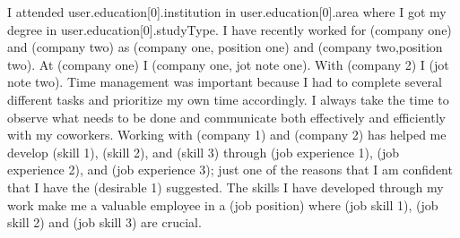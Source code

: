 I attended {{user.education[0].institution}} in {{user.education[0].area}} where I got my degree in {{user.education[0].studyType}}. I have recently worked for (company one) and (company two) as (company one, position one) and (company two,position two). At (company one) I (company one, jot note one). With (company 2) I (jot note two). Time management was important because I had to complete several different tasks and prioritize my own time accordingly. I always take the time to observe what needs to be done and communicate both effectively and efficiently with my coworkers. Working with (company 1) and (company 2) has helped me develop (skill 1), (skill 2), and (skill 3) through (job experience 1), (job experience 2), and (job experience 3); just one of the reasons that I am confident that I have the (desirable 1) suggested. The skills I have developed through my work make me a valuable employee in a (job position) where (job skill 1), (job skill 2) and (job skill 3) are crucial.
